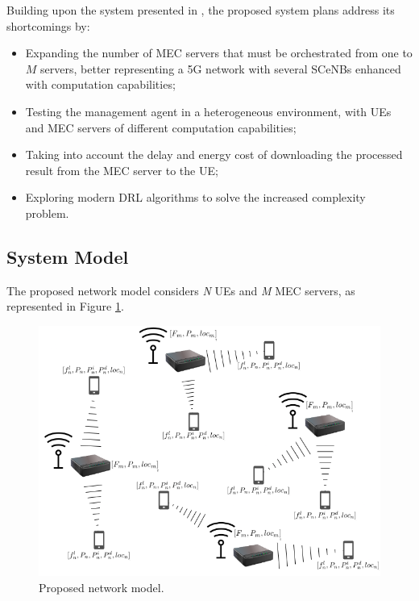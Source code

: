 \documentclass[conference]{IEEEtran}
\begin{document}
Building upon the system presented in \cite{NUE1mec}, the proposed system plans address its shortcomings by:
\begin{itemize}
    \item Expanding the number of \acrshort{MEC} servers that must be orchestrated from one to $M$ servers, better representing a 5G network with several \acrshort{SCeNBs} enhanced with computation capabilities;
    \item Testing the management agent in a heterogeneous environment, with \acrshort{UE}s and \acrshort{MEC} servers of different computation capabilities;
    \item Taking into account the delay and energy cost of downloading the processed result from the \acrshort{MEC} server to the \acrshort{UE};
    \item Exploring modern \acrshort{DRL} algorithms to solve the increased complexity problem.
\end{itemize}

\subsection{System Model}
\noindent The proposed network model considers \emph{N} \acrshort{UE}s and \emph{M} \acrshort{MEC} servers, as represented in Figure \ref{proposed_network}. 

\begin{figure}[H]
  \centering
  \includegraphics[width=\linewidth]{images/proposed_network.png}
  \caption{Proposed network model.} \label{proposed_network}
\end{figure}
\end{document}
